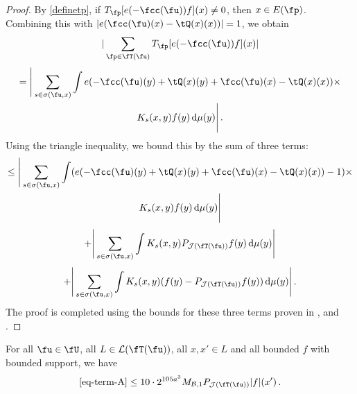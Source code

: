 \begin{proof}
    By \eqref{definetp}, if $T_{\fp}[ e(-\fcc(\fu))f](x) \ne 0$, then $x \in E(\fp)$. Combining this with $|e(\fcc(\fu)(x)-\tQ(x)(x))| = 1$, we obtain
    $$
        |\sum_{\fp \in \fT(\fu)} T_{\fp}[ e(-\fcc(\fu))f](x)|
    $$
    \begin{multline*}
        = \Bigg| \sum_{s \in \sigma(\fu, x)} \int e(-\fcc(\fu)(y) + \tQ(x)(y) + \fcc(\fu)(x) -\tQ(x)(x))\times\\
        K_s(x,y)f(y) \, \mathrm{d}\mu(y) \Bigg|\,.
    \end{multline*}
    Using the triangle inequality, we bound this by the sum of three terms:
    \begin{multline}
        \label{eq-term-A}
        \le \Bigg| \sum_{s \in \sigma(\fu, x)} \int (e(-\fcc(\fu)(y) + \tQ(x)(y) + \fcc(\fu)(x) -\tQ(x)(x))-1)\times\\
        K_s(x,y)f(y) \, \mathrm{d}\mu(y) \Bigg|
    \end{multline}
    \begin{equation}
        \label{eq-term-B}
        + \Bigg| \sum_{s \in \sigma(\fu, x)} \int K_s(x,y) P_{\mathcal{J}(\fT(\fu))} f(y) \, \mathrm{d}\mu(y) \Bigg|
    \end{equation}
    \begin{equation}
        \label{eq-term-C}
        + \Bigg| \sum_{s \in \sigma(\fu, x)} \int K_s(x,y) (f(y) - P_{\mathcal{J}(\fT(\fu))} f(y)) \, \mathrm{d}\mu(y) \Bigg|\,.
    \end{equation}
    The proof is completed using the bounds for these three terms proven in ,  and .
\end{proof}

\begin{lemma}
    \label{first-tree-pointwise}
    For all $\fu \in \fU$, all $L \in \mathcal{L}(\fT(\fu))$, all $x, x' \in L$ and all bounded $f$ with bounded support, we have
    $$
        \eqref{eq-term-A} \le 10 \cdot 2^{105a^3} M_{\mathcal{B}, 1}P_{\mathcal{J}(\fT(\fu))}|f|(x')\,.
    $$
\end{lemma}

